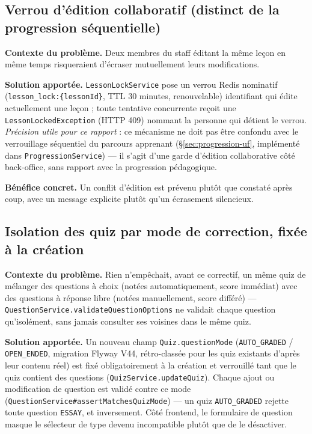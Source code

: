 \subsection{Verrou d'édition collaboratif (distinct de la progression séquentielle)}
\label{sec:verrou-edition}

\textbf{Contexte du problème.} Deux membres du staff éditant la même leçon
en même temps risqueraient d'écraser mutuellement leurs modifications.

\textbf{Solution apportée.} \texttt{LessonLockService} pose un verrou
Redis nominatif (\texttt{lesson\_lock:\{lessonId\}}, TTL 30 minutes,
renouvelable) identifiant qui édite actuellement une leçon ; toute
tentative concurrente reçoit une \texttt{LessonLockedException} (HTTP 409)
nommant la personne qui détient le verrou. \emph{Précision utile pour ce
rapport} : ce mécanisme ne doit pas être confondu avec le verrouillage
séquentiel du parcours apprenant (\S\ref{sec:progression-uf}, implémenté
dans \texttt{ProgressionService}) --- il s'agit d'une garde d'édition
collaborative côté back-office, sans rapport avec la progression
pédagogique.

\textbf{Bénéfice concret.} Un conflit d'édition est prévenu plutôt que
constaté après coup, avec un message explicite plutôt qu'un écrasement
silencieux.

\subsection{Isolation des quiz par mode de correction, fixée à la création}
\label{sec:quiz-mode}

\textbf{Contexte du problème.} Rien n'empêchait, avant ce correctif, un
même quiz de mélanger des questions à choix (notées automatiquement, score
immédiat) avec des questions à réponse libre (notées manuellement, score
différé) --- \texttt{QuestionService.validateQuestionOptions} ne validait
chaque question qu'isolément, sans jamais consulter ses voisines dans le
même quiz.

\textbf{Solution apportée.} Un nouveau champ \texttt{Quiz.questionMode}
(\texttt{AUTO\_GRADED} / \texttt{OPEN\_ENDED}, migration Flyway V44,
rétro-classée pour les quiz existants d'après leur contenu réel) est fixé
obligatoirement à la création et verrouillé tant que le quiz contient des
questions (\texttt{QuizService.updateQuiz}). Chaque ajout ou modification
de question est validé contre ce mode
(\texttt{QuestionService\#assertMatchesQuizMode}) --- un quiz
\texttt{AUTO\_GRADED} rejette toute question \texttt{ESSAY}, et
inversement. Côté frontend, le formulaire de question masque le sélecteur
de type devenu incompatible plutôt que de le désactiver.

